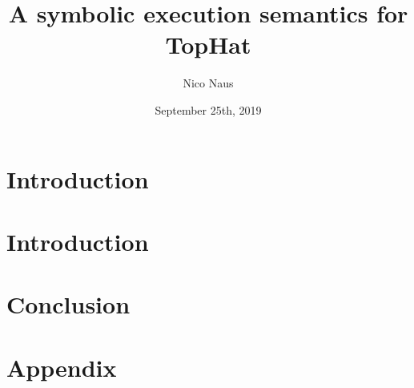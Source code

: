 \documentclass{beamer}
\title[SYMBOLIC TOPHAT]{A symbolic execution semantics for TopHat}
\author{Nico Naus}
\institute{\texttt{[image: uulogo.png]}}
\date{September 25th, 2019}
\begin{document}
\begin{frame}
  \titlepage
\end{frame}


\section{Introduction}



\section{Introduction}
\begin{frame}{}

\end{frame}




\section{Conclusion}


\begin{frame}

\end{frame}

\section*{Appendix}
\appendix
\end{document}
